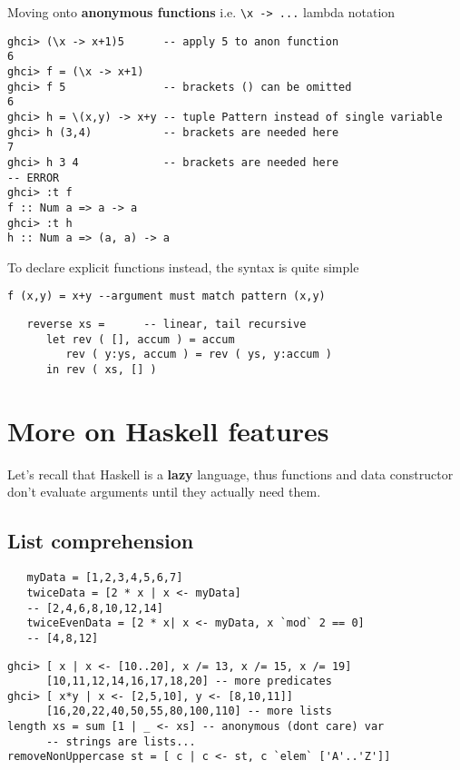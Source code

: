 Moving onto \textbf{anonymous functions} i.e. \lstinline|\x -> ...| lambda notation
\begin{lstlisting}
ghci> (\x -> x+1)5      -- apply 5 to anon function
6
ghci> f = (\x -> x+1)
ghci> f 5               -- brackets () can be omitted
6
ghci> h = \(x,y) -> x+y -- tuple Pattern instead of single variable
ghci> h (3,4)           -- brackets are needed here
7
ghci> h 3 4             -- brackets are needed here
-- ERROR
ghci> :t f
f :: Num a => a -> a
ghci> :t h
h :: Num a => (a, a) -> a
\end{lstlisting}

To declare explicit functions instead, the syntax is quite simple
\begin{lstlisting}
f (x,y) = x+y --argument must match pattern (x,y)
\end{lstlisting}

\begin{lstlisting}
   reverse xs =      -- linear, tail recursive
      let rev ( [], accum ) = accum
         rev ( y:ys, accum ) = rev ( ys, y:accum )
      in rev ( xs, [] )
\end{lstlisting}


\section{More on Haskell features}
Let's recall that Haskell is a \textbf{lazy} language,
thus functions and data constructor don't evaluate arguments until they actually need them.

\subsection{List comprehension}

\begin{lstlisting}
   myData = [1,2,3,4,5,6,7]
   twiceData = [2 * x | x <- myData]
   -- [2,4,6,8,10,12,14]
   twiceEvenData = [2 * x| x <- myData, x `mod` 2 == 0]
   -- [4,8,12]
\end{lstlisting}

\begin{lstlisting}
ghci> [ x | x <- [10..20], x /= 13, x /= 15, x /= 19]
      [10,11,12,14,16,17,18,20] -- more predicates
ghci> [ x*y | x <- [2,5,10], y <- [8,10,11]]
      [16,20,22,40,50,55,80,100,110] -- more lists
length xs = sum [1 | _ <- xs] -- anonymous (dont care) var
      -- strings are lists...
removeNonUppercase st = [ c | c <- st, c `elem` ['A'..'Z']]
\end{lstlisting}

